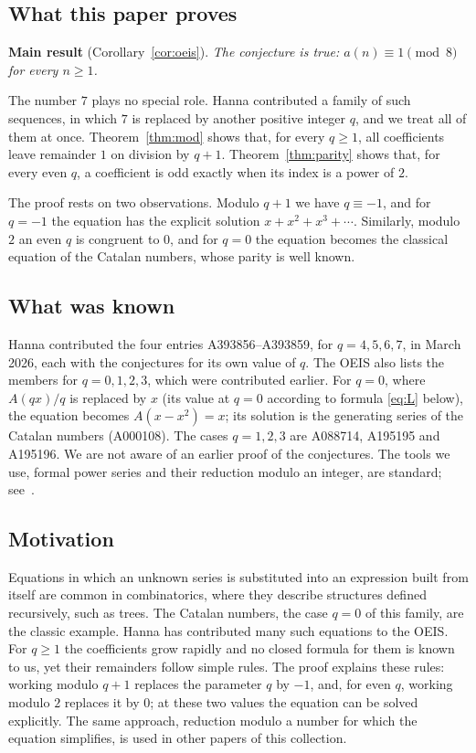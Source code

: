 \documentclass[11pt,a4paper]{article}
\theoremstyle{definition}
\theoremstyle{remark}
\begin{document}
\subsection{What this paper proves}
\textbf{Main result} (Corollary~\ref{cor:oeis}). \emph{The conjecture is true: $a(n)\equiv1\pmod{8}$ for every $n\ge1$.}

The number $7$ plays no special role. Hanna contributed a family of such sequences, in which
$7$ is replaced by another positive integer $q$, and we treat all of them at once.
Theorem~\ref{thm:mod} shows that, for every $q\ge1$, all coefficients leave remainder $1$ on division by $q+1$.
Theorem~\ref{thm:parity} shows that, for every even $q$, a coefficient is odd exactly when its index is a power of $2$.

The proof rests on two observations. Modulo $q+1$ we have $q\equiv-1$, and for $q=-1$ the equation has the
explicit solution $x+x^2+x^3+\cdots$. Similarly, modulo $2$ an even $q$ is congruent to $0$, and for $q=0$ the
equation becomes the classical equation of the Catalan numbers, whose parity is well known.

\subsection{What was known}
Hanna contributed the four entries A393856--A393859, for $q=4,5,6,7$, in March 2026, each with the conjectures for its
own value of $q$. The OEIS also lists the members for $q=0,1,2,3$, which were contributed earlier. For $q=0$, where
$A(qx)/q$ is replaced by $x$ (its value at $q=0$ according to formula \eqref{eq:L} below), the equation becomes
$A(x-x^2)=x$; its solution is the generating series of the Catalan numbers (A000108). The cases $q=1,2,3$ are
A088714, A195195 and A195196. We are not aware of an earlier proof of the conjectures. The tools we use, formal power
series and their reduction modulo an integer, are standard; see~\cite{niven,stanley}.

\subsection{Motivation}
Equations in which an unknown series is substituted into an expression built from itself are common in
combinatorics, where they describe structures defined recursively, such as trees. The Catalan numbers, the case $q=0$
of this family, are the classic example. Hanna has contributed many such equations to the OEIS. For $q\ge1$ the
coefficients grow rapidly and no closed formula for them is known to us, yet their remainders follow simple rules. The
proof explains these rules: working modulo $q+1$ replaces the parameter $q$ by $-1$, and, for even $q$, working modulo
$2$ replaces it by $0$; at these two values the equation can be solved explicitly. The same approach, reduction modulo
a number for which the equation simplifies, is used in other papers of this collection.
\end{document}

